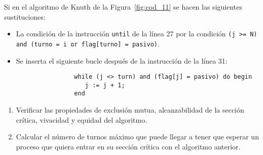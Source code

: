\begin{ejercicio}
    Si en el algoritmo de Knuth de la Figura~\ref{fig:cod_11} se hacen las siguientes sustituciones:
    \begin{itemize}
        \item La condición de la instrucción \verb|until| de la línea 27 por la condición \newline \verb|(j >= N) and (turno = i or flag[turno] = pasivo)|.
        \item Se inserta el siguiente bucle después de la instrucción de la línea 31:
            \begin{verbatim}
                while (j <> turn) and (flag[j] = pasivo) do begin
                   j := j + 1;
                end
            \end{verbatim}
    \end{itemize}
    \begin{enumerate}[label=(\alph*)]
        \item Verificar las propiedades de exclusión mutua, alcanzabilidad de la sección crítica, vivacidad y equidad del algoritmo.
        \item Calcular el número de turnos máximo que puede llegar a tener que esperar un proceso que quiera entrar en su sección crítica con el algoritmo anterior.
    \end{enumerate}
\end{ejercicio}

